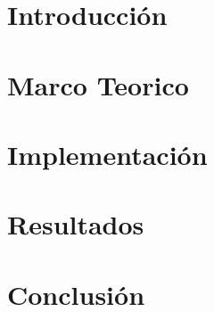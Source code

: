 \documentclass[10pt,a4paper]{article}
\date{\today}
\begin{document}
\begin{titlepage}
	
\end{titlepage}
\section*{Introducción}\label{Introduccion}
	
\section*{Marco Teorico}\label{Marco Teorico}
	
\section*{Implementación}\label{Implementacion}
	
\section*{Resultados}\label{Resultados}
	
\section*{Conclusión}\label{Conclusión}
 
	
\end{document}
